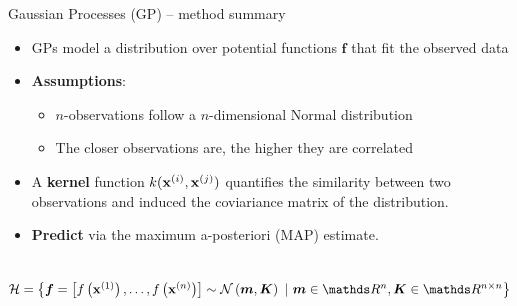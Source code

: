 
\begin{frame}{Gaussian Processes (GP) -- method summary}

   

\medskip

\begin{itemize}
  \item GPs model a distribution over potential functions $\bm{f}$ that fit the observed data
  \item \textbf{Assumptions}:
  \begin{itemize}
     \item $n$-observations follow a $n$-dimensional Normal distribution
     \item The closer observations are, the higher they are correlated
  \end{itemize}
  \item A \textbf{kernel} function $k(\mathbf{x}^{(i)}, \mathbf{x}^{(j)})$ quantifies the similarity between two observations and induced the coviariance matrix of the distribution. 
  \item \textbf{Predict} via the maximum a-posteriori (MAP) estimate.
\end{itemize}

\medskip

 ~~
$\Hspace = \left\{ \bm{f} = \left[f\left(\xi[1]\right), \dots, f\left(\xi[n]\right)\right] \sim \mathcal{N}\left(\bm{m}, \bm{K}\right) ~|~ \bm{m} \in \R^n, \bm{K} \in \R^{n\times n} \right\}$

\medskip


\end{frame}

